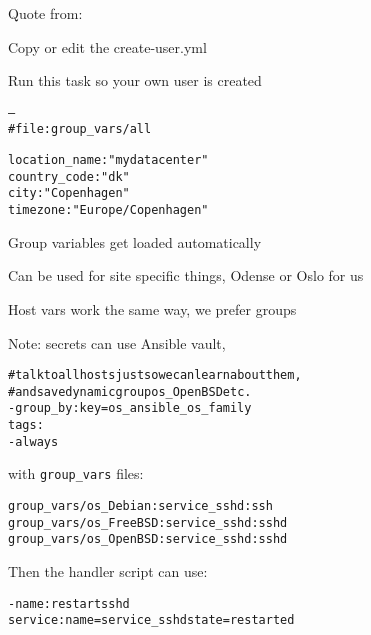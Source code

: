\documentclass[18pt,landscape,a4paper,footrule]{foils}
\begin{document}
Quote from:\\


\begin{list2}
\item Copy or edit the create-user.yml
\item Run this task so your own user is created
\item
\item
\end{list2}




\begin{alltt}
---
# file: group_vars/all

location_name : "mydatacenter"
country_code : "dk"
city : "Copenhagen"
timezone : "Europe/Copenhagen"
\end{alltt}

\begin{list2}
\item Group variables get loaded automatically
\item Can be used for site specific things, Odense or Oslo for us
\item Host vars work the same way, we prefer groups
\item Note: secrets can use Ansible vault, 
\end{list2}



\begin{alltt}
  # talk to all hosts just so we can learn about them,
  # and save dynamic group os_OpenBSD etc.
  - group_by: key=os_{{ ansible_os_family }}
    tags:
        - always
\end{alltt}

with \verb+group_vars+ files:
\begin{alltt}
group_vars/os_Debian:service_sshd: ssh
group_vars/os_FreeBSD:service_sshd: sshd
group_vars/os_OpenBSD:service_sshd: sshd
\end{alltt}

Then the handler script can use:
\begin{alltt}
  - name: restart sshd
    service: name={{ service_sshd }} state=restarted
\end{alltt}
\end{document}
